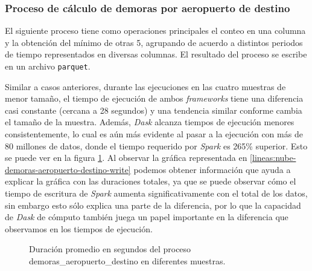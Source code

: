 \subsubsection{Proceso de cálculo de demoras por aeropuerto de destino}

El siguiente proceso tiene como operaciones principales el conteo en una columna y la obtención del mínimo de otras 5, agrupando de acuerdo a distintos periodos de tiempo representados en diversas columnas. El resultado del proceso se escribe en un archivo \texttt{parquet}.

Similar a casos anteriores, durante las ejecuciones en las cuatro muestras de menor tamaño, el tiempo de ejecución de ambos \textit{frameworks} tiene una diferencia casi constante (cercana a 28 segundos) y una tendencia similar conforme cambia el tamaño de la muestra. Además, \textit{Dask} alcanza tiempos de ejecución menores consistentemente, lo cual es aún más evidente al pasar a la ejecución con más de 80 millones de datos, donde el tiempo requerido por \textit{Spark} es 265\% superior. Esto se puede ver en la figura \ref{lineas:nube-demoras-aeropuerto-destino}. Al observar la gráfica representada en \ref{lineas:nube-demoras-aeropuerto-destino-write} podemos obtener información que ayuda a explicar la gráfica con las duraciones totales, ya que se puede observar cómo el tiempo de escritura de \textit{Spark} aumenta significativamente con el total de los datos, sin embargo esto sólo explica una parte de la diferencia, por lo que la capacidad de \textit{Dask} de cómputo también juega un papel importante en la diferencia que observamos en los tiempos de ejecución.

\begin{figure}
\centering
{}
\caption{Duración promedio en segundos del proceso demoras\_aeropuerto\_destino en diferentes muestras.}
\label{lineas:nube-demoras-aeropuerto-destino}
\end{figure}

